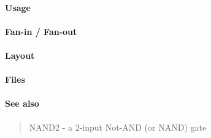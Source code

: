 \paragraph{Usage}

\paragraph{Fan-in / Fan-out}

\paragraph{Layout}

\paragraph{Files}

\paragraph{See also}
\begin{quote}
    NAND2 - a 2-input Not-AND (or NAND) gate
\end{quote}
